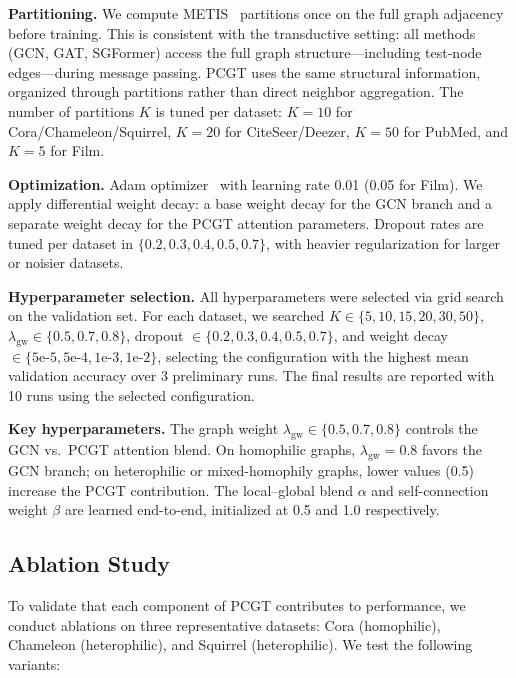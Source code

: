 \documentclass[sigconf]{acmart}
\begin{document}
\textbf{Partitioning.} We compute METIS~\citep{karypis1998metis} partitions once on the full graph adjacency before training. This is consistent with the transductive setting: all methods (GCN, GAT, SGFormer) access the full graph structure---including test-node edges---during message passing. PCGT uses the same structural information, organized through partitions rather than direct neighbor aggregation. The number of partitions $K$ is tuned per dataset: $K=10$ for Cora/Chameleon/Squirrel, $K=20$ for CiteSeer/Deezer, $K=50$ for PubMed, and $K=5$ for Film.

\textbf{Optimization.} Adam optimizer~\citep{kingma2015adam} with learning rate 0.01 (0.05 for Film). We apply differential weight decay: a base weight decay for the GCN branch and a separate weight decay for the PCGT attention parameters. Dropout rates are tuned per dataset in $\{0.2, 0.3, 0.4, 0.5, 0.7\}$, with heavier regularization for larger or noisier datasets.

\textbf{Hyperparameter selection.} All hyperparameters were selected via grid search on the validation set. For each dataset, we searched $K \in \{5, 10, 15, 20, 30, 50\}$, $\lambda_{\text{gw}} \in \{0.5, 0.7, 0.8\}$, dropout $\in \{0.2, 0.3, 0.4, 0.5, 0.7\}$, and weight decay $\in \{5\text{e-}5, 5\text{e-}4, 1\text{e-}3, 1\text{e-}2\}$, selecting the configuration with the highest mean validation accuracy over 3 preliminary runs. The final results are reported with 10 runs using the selected configuration.

\textbf{Key hyperparameters.} The graph weight $\lambda_{\text{gw}} \in \{0.5, 0.7, 0.8\}$ controls the GCN vs.\ PCGT attention blend. On homophilic graphs, $\lambda_{\text{gw}}=0.8$ favors the GCN branch; on heterophilic or mixed-homophily graphs, lower values (0.5) increase the PCGT contribution. The local--global blend $\alpha$ and self-connection weight $\beta$ are learned end-to-end, initialized at 0.5 and 1.0 respectively.

\subsection{Ablation Study}
\label{sec:ablation}

To validate that each component of PCGT contributes to performance, we conduct ablations on three representative datasets: Cora (homophilic), Chameleon (heterophilic), and Squirrel (heterophilic). We test the following variants:
\end{document}
